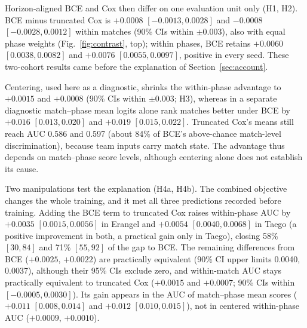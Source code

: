 \documentclass[sigconf,anonymous]{acmart}
\begin{document}
Horizon-aligned BCE and Cox then differ on one evaluation unit only (H1, H2). BCE minus truncated Cox is $+0.0008$ $[-0.0013,\allowbreak 0.0028]$ and $-0.0008$ $[-0.0028,\allowbreak 0.0012]$ within matches (90\% CIs within $\pm0.003$), also with equal phase weights (Fig.~\ref{fig:contrast}, top); within phases, BCE retains $+0.0060$ $[0.0038,\allowbreak 0.0082]$ and $+0.0076$ $[0.0055,\allowbreak 0.0097]$, positive in every seed. These two-cohort results came before the explanation of Section~\ref{sec:account}.

Centering, used here as a diagnostic, shrinks the within-phase advantage to $+0.0015$ and $+0.0008$ (90\% CIs within $\pm0.003$; H3), whereas in a separate diagnostic match--phase mean logits alone rank matches better under BCE by $+0.016$ $[0.013,\allowbreak 0.020]$ and $+0.019$ $[0.015,\allowbreak 0.022]$. Truncated Cox's means still reach AUC 0.586 and 0.597 (about 84\% of BCE's above-chance match-level discrimination), because team inputs carry match state. The advantage thus depends on match--phase score levels, although centering alone does not establish its cause.

Two manipulations test the explanation (H4a, H4b). The combined objective changes the whole training, and it met all three predictions recorded before training. Adding the BCE term to truncated Cox raises within-phase AUC by $+0.0035$ $[0.0015,\allowbreak 0.0056]$ in Erangel and $+0.0054$ $[0.0040,\allowbreak 0.0068]$ in Taego (a positive improvement in both, a practical gain only in Taego), closing 58\% $[30,\allowbreak 84]$ and 71\% $[55,\allowbreak 92]$ of the gap to BCE. The remaining differences from BCE ($+0.0025$, $+0.0022$) are practically equivalent (90\% CI upper limits 0.0040, 0.0037), although their 95\% CIs exclude zero, and within-match AUC stays practically equivalent to truncated Cox ($+0.0015$ and $+0.0007$; 90\% CIs within $[-0.0005,\allowbreak 0.0030]$). Its gain appears in the AUC of match--phase mean scores ($+0.011$ $[0.008,\allowbreak 0.014]$ and $+0.012$ $[0.010,\allowbreak 0.015]$), not in centered within-phase AUC ($+0.0009$, $+0.0010$). 
\end{document}
